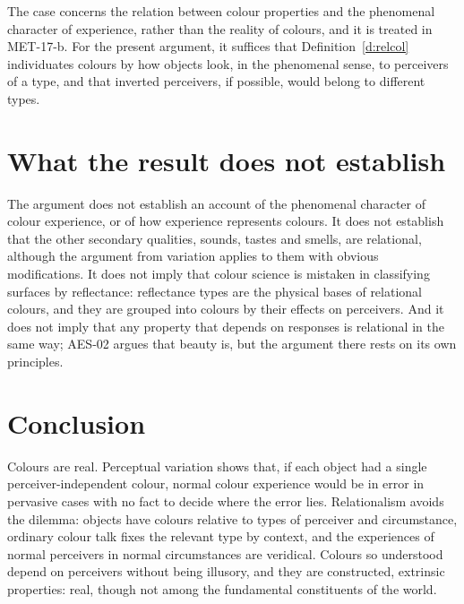 \documentclass{situationist-preprint}
\begin{document}
\begin{reply}
The case concerns the relation between colour properties and the phenomenal character of experience, rather than the reality of colours, and it is treated in MET-17-b. For the present argument, it suffices that Definition~\ref{d:relcol} individuates colours by how objects look, in the phenomenal sense, to perceivers of a type, and that inverted perceivers, if possible, would belong to different types.
\end{reply}

\section{What the result does not establish}

The argument does not establish an account of the phenomenal character of colour experience, or of how experience represents colours. It does not establish that the other secondary qualities, sounds, tastes and smells, are relational, although the argument from variation applies to them with obvious modifications. It does not imply that colour science is mistaken in classifying surfaces by reflectance: reflectance types are the physical bases of relational colours, and they are grouped into colours by their effects on perceivers. And it does not imply that any property that depends on responses is relational in the same way; AES-02 argues that beauty is, but the argument there rests on its own principles.

\section{Conclusion}

Colours are real. Perceptual variation shows that, if each object had a single perceiver-independent colour, normal colour experience would be in error in pervasive cases with no fact to decide where the error lies. Relationalism avoids the dilemma: objects have colours relative to types of perceiver and circumstance, ordinary colour talk fixes the relevant type by context, and the experiences of normal perceivers in normal circumstances are veridical. Colours so understood depend on perceivers without being illusory, and they are constructed, extrinsic properties: real, though not among the fundamental constituents of the world.
\end{document}
